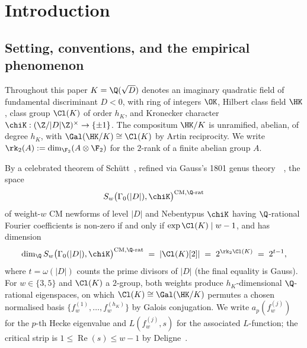 \section{Introduction}\label{sec:intro}

\subsection{Setting, conventions, and the empirical phenomenon}
\label{ss:setting}
Throughout this paper $K = \Q(\sqrt{D})$ denotes an imaginary
quadratic field of fundamental discriminant $D < 0$, with ring of
integers $\OK$, Hilbert class field $\HK$, class group $\Cl(K)$ of
order $h_K$, and Kronecker character $\chiK : (\Z/|D|\Z)^\times
\to \{\pm 1\}$. The compositum $\HK/K$ is unramified, abelian,
of degree $h_K$, with $\Gal(\HK/K) \cong \Cl(K)$ by Artin
reciprocity. We write $\rk_2(A) := \dim_{\F_2}(A \otimes \F_2)$ for
the $2$-rank of a finite abelian group $A$.

By a celebrated theorem of Sch\"utt~\cite{Schutt2008}, refined via
Gauss's 1801 genus theory~\cite{Gauss1801}~\cite[Thm.~3.15]{Cox1989},
the space
\[
S_w\bigl(\Gamma_0(|D|), \chiK\bigr)^{\mathrm{CM},\Q\text{-rat}}
\]
of weight-$w$ CM newforms of level $|D|$ and Nebentypus $\chiK$
having $\Q$-rational Fourier coefficients is non-zero if and only
if $\exp \Cl(K) \mid w-1$, and has dimension
\begin{equation}\label{eq:dim-schutt}
\dim_\Q S_w\bigl(\Gamma_0(|D|), \chiK\bigr)^{\mathrm{CM},\Q\text{-rat}}
\;=\; |\Cl(K)[2]| \;=\; 2^{\rk_2 \Cl(K)} \;=\; 2^{t-1},
\end{equation}
where $t = \omega(|D|)$ counts the prime divisors of $|D|$ (the
final equality is Gauss). For $w \in \{3,5\}$ and $\Cl(K)$ a
$2$-group, both weights produce $h_K$-dimensional $\Q$-rational
eigenspaces, on which $\Cl(K) \cong \Gal(\HK/K)$ permutes a chosen
normalised basis $\{f_w^{(1)}, \dots, f_w^{(h_K)}\}$ by Galois
conjugation. We write $a_p(f_w^{(j)})$ for the $p$-th Hecke
eigenvalue and $L(f_w^{(j)}, s)$ for the associated $L$-function;
the critical strip is $1 \leq \operatorname{Re}(s) \leq w-1$ by
Deligne~\cite{Deligne1979}.

